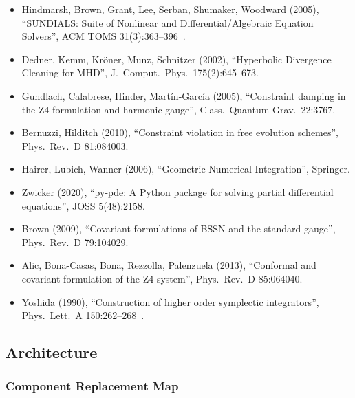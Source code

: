 \begin{itemize}
  \item Hindmarsh, Brown, Grant, Lee, Serban, Shumaker, Woodward (2005), ``SUNDIALS:
    Suite of Nonlinear and Differential/Algebraic Equation Solvers'', ACM TOMS
    31(3):363--396~\cite{hindmarsh2005sundials}.
  \item Dedner, Kemm, Kr\"oner, Munz, Schnitzer (2002), ``Hyperbolic Divergence
    Cleaning for MHD'', J.\ Comput.\ Phys.\ 175(2):645--673.
  \item Gundlach, Calabrese, Hinder, Mart\'in-Garc\'ia (2005), ``Constraint damping in
    the Z4 formulation and harmonic gauge'', Class.\ Quantum Grav.\ 22:3767.
  \item Bernuzzi, Hilditch (2010), ``Constraint violation in free evolution schemes'',
    Phys.\ Rev.\ D 81:084003.
  \item Hairer, Lubich, Wanner (2006), ``Geometric Numerical Integration'', Springer.
  \item Zwicker (2020), ``py-pde: A Python package for solving partial differential
    equations'', JOSS 5(48):2158.
  \item Brown (2009), ``Covariant formulations of BSSN and the standard gauge'',
    Phys.\ Rev.\ D 79:104029.
  \item Alic, Bona-Casas, Bona, Rezzolla, Palenzuela (2013), ``Conformal and
    covariant formulation of the Z4 system'', Phys.\ Rev.\ D 85:064040.
  \item Yoshida (1990), ``Construction of higher order symplectic integrators'',
    Phys.\ Lett.\ A 150:262--268~\cite{yoshida1990symplectic}.
\end{itemize}

\subsection{Architecture}
\label{sec:migration-architecture}

\subsubsection{Component Replacement Map}
\label{sec:component-replacement}

